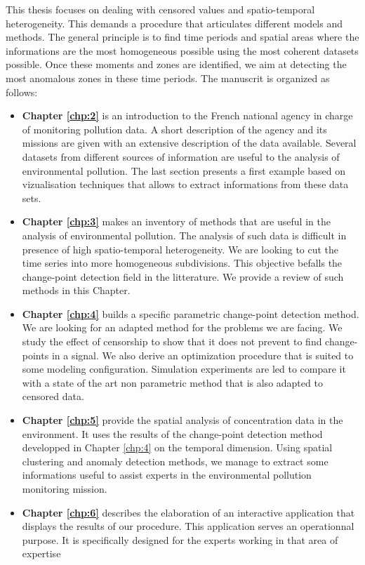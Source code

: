 This thesis focuses on dealing with censored values and spatio-temporal heterogeneity. This demands a procedure that articulates different models and methods. The general principle is to find time periods and spatial areas where the informations are the most homogeneous possible using the most coherent datasets possible. Once these moments and zones are identified, we aim at detecting the most anomalous zones in these time periods. The manuscrit is organized as follows: 
\begin{itemize}
\item{\textbf{Chapter \ref{chp:2}}} is an introduction to the French national agency in charge of monitoring pollution data. A short description of the agency and its missions are given with an extensive description of the data available. Several datasets from different sources of information are useful to the analysis of environmental pollution. The last section presents a first example based on vizualisation techniques that allows to extract informations from these data sets.        
\item{\textbf{Chapter \ref{chp:3}}} makes an inventory of methods that are useful in the analysis of environmental pollution. The analysis of such data is difficult in presence of high spatio-temporal heterogeneity. We are looking to cut the time series into more homogeneous subdivisions. This objective befalls the change-point detection field in the litterature. We provide a review of such methods in this Chapter.    
\item{\textbf{Chapter \ref{chp:4}}} builds a specific parametric change-point detection method. We are looking for an adapted method for the problems we are facing. We study the effect of censorship to show that it does not prevent to find change-points in a signal. We also derive an optimization procedure that is suited to some modeling configuration. Simulation experiments are led to compare it with a state of the art non parametric method that is also adapted to censored data.        
\item{\textbf{Chapter \ref{chp:5}}} provide the spatial analysis of concentration data in the environment. It uses the results of the change-point detection method developped in Chapter \ref{chp:4} on the temporal dimension. Using spatial clustering and anomaly detection methods, we manage to extract some informations useful to assist experts in the environmental pollution monitoring mission.     
\item{\textbf{Chapter \ref{chp:6}}} describes the elaboration of an interactive application that displays the results of our procedure. This application serves an operationnal purpose. It is specifically designed for the experts working in that area of expertise  
\end{itemize}
